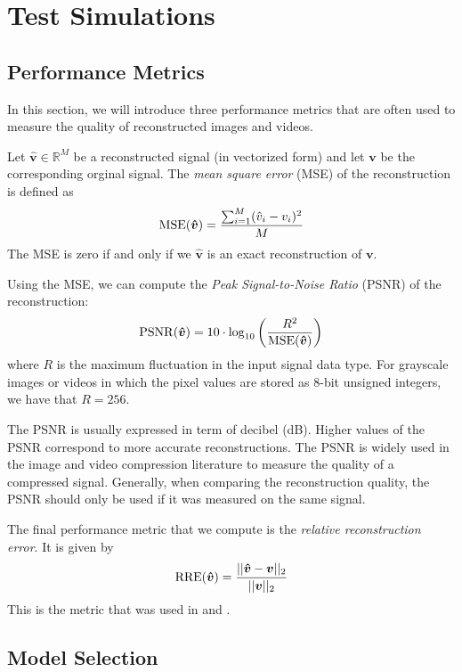 \chapter{Test Simulations}
\label{ch:results}

\section{Performance Metrics}
In this section, we will introduce three performance metrics that are often used to measure the quality of reconstructed images and videos.

Let $\bm \hat{v} \in\mathbb{R}^M$ be a reconstructed signal (in vectorized form) and let $\bm v$ be the corresponding orginal signal.
The \emph{mean square error} (MSE) of the reconstruction is defined as
\begin{equation*}
  \operatorname*{MSE}(\bm{\hat v}) = \frac{\sum_{i=1}^M (\hat v_i - v_i)^2}{M}
\end{equation*}
The MSE is zero if and only if we $\bm{\hat v}$ is an exact reconstruction of $\bm v$.

Using the MSE, we can compute the \emph{Peak Signal-to-Noise Ratio} (PSNR) of the reconstruction:
\begin{equation*}
  \operatorname*{PSNR}(\bm{\hat v}) = 10 \cdot \log_{10} \left(\frac{R^2}{\operatorname*{MSE}(\bm{\hat v})}\right)
\end{equation*}
where $R$ is the maximum fluctuation in the input signal data type. 
For grayscale images or videos in which the pixel values are stored as 8-bit unsigned integers, we have that $R = 256$.

The PSNR is usually expressed in term of decibel (dB). 
Higher values of the PSNR correspond to more accurate reconstructions.
The PSNR is widely used in the image and video compression literature to measure the quality of a compressed signal.
Generally, when comparing the reconstruction quality, the PSNR should only be used if it was measured on the same signal.

The final performance metric that we compute is the \emph{relative reconstruction error}.
It is given by
\begin{equation*}
  \operatorname*{RRE}(\bm{\hat v}) = \frac{||\bm{\hat v} - \bm v||_2}{||\bm v||_2}
\end{equation*}
This is the metric that was used in \cite{ji2008} and \cite{pilikos2014}.

\section{Model Selection}
